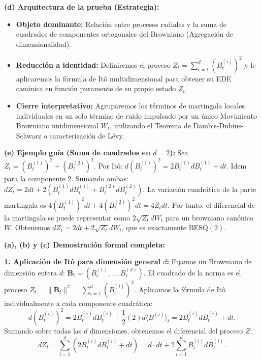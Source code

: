 \documentclass[11pt, letterpaper]{article}
\begin{document}
\begin{solucion}
    \textbf{(d) Arquitectura de la prueba (Estrategia):}
    \begin{itemize}
        \item[(i)] \textbf{Objeto dominante:} Relación entre procesos radiales y la suma de cuadrados de componentes ortogonales del Browniano (Agregación de dimensionalidad).
        \item[(ii)] \textbf{Reducción a identidad:} Definiremos el proceso $Z_t = \sum_{i=1}^d (B_t^{(i)})^2$ y le aplicaremos la fórmula de Itô multidimensional para obtener su EDE canónica en función puramente de su propio estado $Z_t$.
        \item[(iii)] \textbf{Cierre interpretativo:} Agruparemos los términos de martingala locales individuales en un solo término de ruido impulsado por un único Movimiento Browniano unidimensional $W_t$, utilizando el Teorema de Dambis-Dubins-Schwarz o caracterización de Lévy.
    \end{itemize}

    \vspace{3mm}
    \textbf{(e) Ejemplo guía (Suma de cuadrados en $d=2$):}
    Sea $Z_t = (B_t^{(1)})^2 + (B_t^{(2)})^2$.
    Por Itô: $d(B_t^{(1)})^2 = 2B_t^{(1)}dB_t^{(1)} + dt$. Idem para la componente 2.
    Sumando ambas: $dZ_t = 2 dt + 2(B_t^{(1)}dB_t^{(1)} + B_t^{(2)}dB_t^{(2)})$.
    La variación cuadrática de la parte martingala es $4(B_t^{(1)})^2 dt + 4(B_t^{(2)})^2 dt = 4Z_t dt$.
    Por tanto, el diferencial de la martingala se puede representar como $2\sqrt{Z_t} dW_t$ para un browniano canónico $W$. Obtenemos $dZ_t = 2 dt + 2\sqrt{Z_t} dW_t$, que es exactamente $\text{BESQ}(2)$.

    \textbf{(a), (b) y (c) Demostración formal completa:}

    \textbf{1. Aplicación de Itô para dimensión general $d$:}
    Fijamos un Browniano de dimensión entera $d$: $\mathbf{B}_t = (B_t^{(1)}, \dots, B_t^{(d)})$.
    El cuadrado de la norma es el proceso $Z_t = \|\mathbf{B}_t\|^2 = \sum_{i=1}^d (B_t^{(i)})^2$.
    Aplicamos la fórmula de Itô individualmente a cada componente cuadrática:
    \[ d(B_t^{(i)})^2 = 2 B_t^{(i)} dB_t^{(i)} + \frac{1}{2}(2) d\langle B^{(i)} \rangle_t = 2 B_t^{(i)} dB_t^{(i)} + dt. \]
    Sumando sobre todas las $d$ dimensiones, obtenemos el diferencial del proceso $Z$:
    \[ dZ_t = \sum_{i=1}^d \left( 2 B_t^{(i)} dB_t^{(i)} + dt \right) = d \cdot dt + 2 \sum_{i=1}^d B_t^{(i)} dB_t^{(i)}. \]


\end{solucion}
\end{document}
